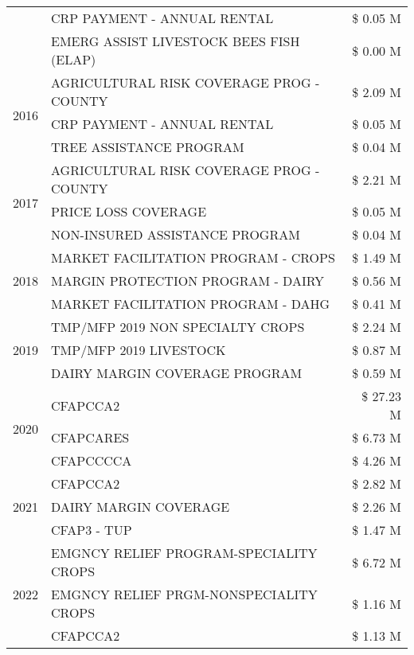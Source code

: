 \begin{tabular}{llr}
 & CRP PAYMENT - ANNUAL RENTAL & \$ 0.05 M \\
 & EMERG ASSIST LIVESTOCK BEES FISH (ELAP) & \$ 0.00 M \\
\cline{1-3}
\multirow[t]{3}{*}{2016} & AGRICULTURAL RISK COVERAGE PROG - COUNTY & \$ 2.09 M \\
 & CRP PAYMENT - ANNUAL RENTAL & \$ 0.05 M \\
 & TREE ASSISTANCE PROGRAM & \$ 0.04 M \\
\cline{1-3}
\multirow[t]{3}{*}{2017} & AGRICULTURAL RISK COVERAGE PROG - COUNTY & \$ 2.21 M \\
 & PRICE LOSS COVERAGE & \$ 0.05 M \\
 & NON-INSURED ASSISTANCE PROGRAM & \$ 0.04 M \\
\cline{1-3}
\multirow[t]{3}{*}{2018} & MARKET FACILITATION PROGRAM - CROPS & \$ 1.49 M \\
 & MARGIN PROTECTION PROGRAM - DAIRY & \$ 0.56 M \\
 & MARKET FACILITATION PROGRAM - DAHG & \$ 0.41 M \\
\cline{1-3}
\multirow[t]{3}{*}{2019} & TMP/MFP 2019 NON SPECIALTY CROPS & \$ 2.24 M \\
 & TMP/MFP 2019 LIVESTOCK & \$ 0.87 M \\
 & DAIRY MARGIN COVERAGE PROGRAM & \$ 0.59 M \\
\cline{1-3}
\multirow[t]{3}{*}{2020} & CFAPCCA2 & \$ 27.23 M \\
 & CFAPCARES & \$ 6.73 M \\
 & CFAPCCCCA & \$ 4.26 M \\
\cline{1-3}
\multirow[t]{3}{*}{2021} & CFAPCCA2 & \$ 2.82 M \\
 & DAIRY MARGIN COVERAGE & \$ 2.26 M \\
 & CFAP3 - TUP & \$ 1.47 M \\
\cline{1-3}
\multirow[t]{3}{*}{2022} & EMGNCY RELIEF PROGRAM-SPECIALITY CROPS & \$ 6.72 M \\
 & EMGNCY RELIEF PRGM-NONSPECIALITY CROPS & \$ 1.16 M \\
 & CFAPCCA2 & \$ 1.13 M \\
\cline{1-3}
\bottomrule
\end{tabular}
